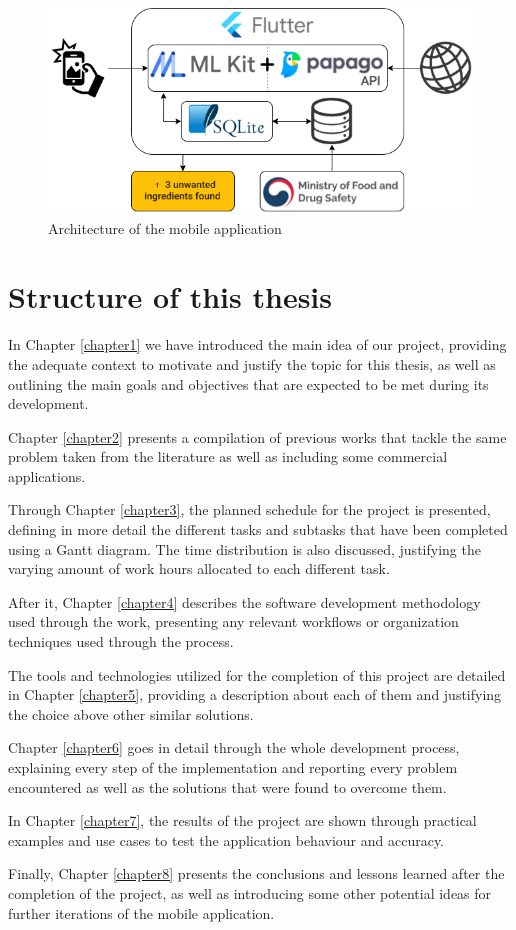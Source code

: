 \begin{figure}[h]
  \centering
  \includegraphics[width=\textwidth]{Figures/architecture.png}
  \caption{%
    Architecture of the mobile application
  }
  \label{fig:architecture}
\end{figure}

\section{Structure of this thesis}

In Chapter \ref{chapter1} we have introduced the main idea of our project, providing the adequate context to motivate and justify the topic for this thesis, as well as outlining the main goals and objectives that are expected to be met during its development.

Chapter \ref{chapter2} presents a compilation of previous works that tackle the same problem taken from the literature as well as including some commercial applications.

Through Chapter \ref{chapter3}, the planned schedule for the project is presented, defining in more detail the different tasks and subtasks that have been completed using a Gantt diagram. The time distribution is also discussed, justifying the varying amount of work hours allocated to each different task.

After it, Chapter \ref{chapter4} describes the software development methodology used through the work, presenting any relevant workflows or organization techniques used through the process.

The tools and technologies utilized for the completion of this project are detailed in Chapter \ref{chapter5}, providing a description about each of them and justifying the choice above other similar solutions.

Chapter \ref{chapter6} goes in detail through the whole development process, explaining every step of the implementation and reporting every problem encountered as well as the solutions that were found to overcome them.

In Chapter \ref{chapter7}, the results of the project are shown through practical examples and use cases to test the application behaviour and accuracy.

Finally, Chapter \ref{chapter8} presents the conclusions and lessons learned after the completion of the project, as well as introducing some other potential ideas for further iterations of the mobile application.